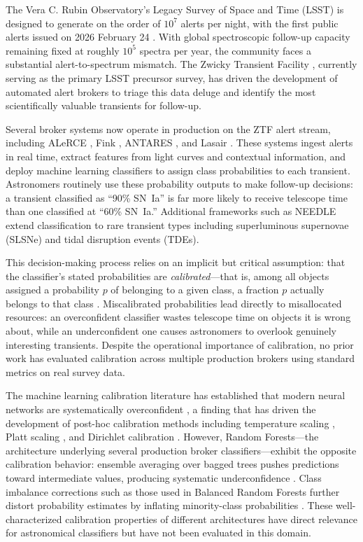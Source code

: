 \documentclass[twocolumn]{aastex631}
\begin{document}
The Vera C. Rubin Observatory's Legacy Survey of Space and Time (LSST) is designed to generate on the order of $10^7$ alerts per night, with the first public alerts issued on 2026 February 24 \citep{ivezic2019}. With global spectroscopic follow-up capacity remaining fixed at roughly $10^5$ spectra per year, the community faces a substantial alert-to-spectrum mismatch. The Zwicky Transient Facility \citep[ZTF;][]{bellm2019}, currently serving as the primary LSST precursor survey, has driven the development of automated alert brokers to triage this data deluge and identify the most scientifically valuable transients for follow-up.

Several broker systems now operate in production on the ZTF alert stream, including ALeRCE \citep{forster2021}, Fink \citep{moller2021}, ANTARES \citep{narayan2018}, and Lasair \citep{smith2019}. These systems ingest alerts in real time, extract features from light curves and contextual information, and deploy machine learning classifiers to assign class probabilities to each transient. Astronomers routinely use these probability outputs to make follow-up decisions: a transient classified as ``90\% SN~Ia'' is far more likely to receive telescope time than one classified at ``60\% SN~Ia.'' Additional frameworks such as NEEDLE \citep{sheng2024} extend classification to rare transient types including superluminous supernovae (SLSNe) and tidal disruption events (TDEs).

This decision-making process relies on an implicit but critical assumption: that the classifier's stated probabilities are \emph{calibrated}---that is, among all objects assigned a probability $p$ of belonging to a given class, a fraction $p$ actually belongs to that class \citep{dawid1982}. Miscalibrated probabilities lead directly to misallocated resources: an overconfident classifier wastes telescope time on objects it is wrong about, while an underconfident one causes astronomers to overlook genuinely interesting transients. Despite the operational importance of calibration, no prior work has evaluated calibration across multiple production brokers using standard metrics on real survey data.

The machine learning calibration literature has established that modern neural networks are systematically overconfident \citep{guo2017}, a finding that has driven the development of post-hoc calibration methods including temperature scaling \citep{guo2017}, Platt scaling \citep{platt1999}, and Dirichlet calibration \citep{kull2019}. However, Random Forests---the architecture underlying several production broker classifiers---exhibit the opposite calibration behavior: ensemble averaging over bagged trees pushes predictions toward intermediate values, producing systematic underconfidence \citep{niculescumizil2005, bostrom2008}. Class imbalance corrections such as those used in Balanced Random Forests further distort probability estimates by inflating minority-class probabilities \citep{vandengoorbergh2022}. These well-characterized calibration properties of different architectures have direct relevance for astronomical classifiers but have not been evaluated in this domain.
\end{document}
